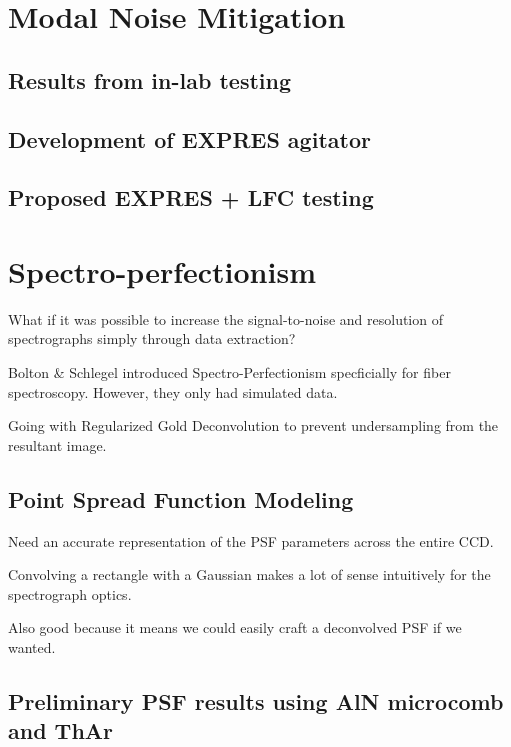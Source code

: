 \documentclass[12pt]{article}
\begin{document}
\section{Modal Noise Mitigation}
\label{sec:modal_noise}



\subsection{Results from in-lab testing}

\subsection{Development of EXPRES agitator}

\subsection{Proposed EXPRES + LFC testing}

\section{Spectro-perfectionism}
\label{sec:spec_perf}

What if it was possible to increase the signal-to-noise and resolution of spectrographs simply through data extraction?

Bolton \& Schlegel introduced Spectro-Perfectionism specficially for fiber spectroscopy. However, they only had simulated data.

Going with Regularized Gold Deconvolution to prevent undersampling from the resultant image.

\subsection{Point Spread Function Modeling}

Need an accurate representation of the PSF parameters across the entire CCD.

Convolving a rectangle with a Gaussian makes a lot of sense intuitively for the spectrograph optics.

Also good because it means we could easily craft a deconvolved PSF if we wanted.

\subsection{Preliminary PSF results using AlN microcomb and ThAr}
\end{document}
